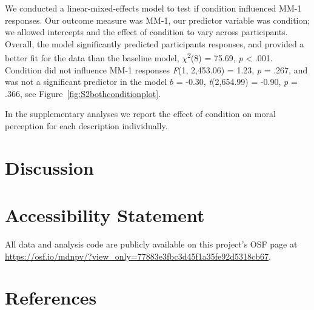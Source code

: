 \documentclass[
  english,
  man,floatsintext]{apa7}
\begin{document}
We conducted a linear-mixed-effects model to test if condition influenced MM-1 responses. Our outcome measure was MM-1, our predictor variable was condition; we allowed intercepts and the effect of condition to vary across participants. Overall, the model significantly predicted participants responses, and provided a better fit for the data than the baseline model, \(\chi\)\textsuperscript{2}(8) = 75.69, \emph{p} \textless{} .001. Condition did not influence MM-1 responses \emph{F}(1, 2,453.06) = 1.23, \emph{p} = .267, and was not a significant predictor in the model \(b\) = -0.30, \emph{t}(2,654.99) = -0.90, \emph{p} = .366, see Figure~\ref{fig:S2bothconditionplot}.

In the supplementary analyses we report the effect of condition on moral perception for each description individually.

\newpage

\hypertarget{discussion}{%
\section{Discussion}\label{discussion}}

\hypertarget{accessibility-statement}{%
\section{Accessibility Statement}\label{accessibility-statement}}

All data and analysis code are publicly available on this project's OSF page at \color{blue}\url{https://osf.io/mdnpv/?view_only=77883e3fbc3d45f1a35fe92d5318cb67}\color{black}.

\newpage

\hypertarget{references}{%
\section*{References}\label{references}}
\end{document}
